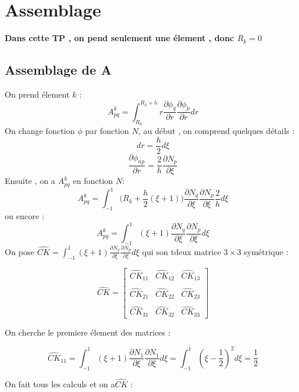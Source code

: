\documentclass[a4paper,10pt]{report} %
\begin{document}
\section{Assemblage}
\textbf{Dans cette TP , on pend seulement une élement , donc $R_k=0$ }
\subsection{Assemblage de A}
On prend élement $k$ :
\begin{equation}
A_{pq}^k=\int_{R_k}^{R_k+h}r\frac{\partial \phi_q}{\partial r}\frac{\partial \phi_p}{\partial r}dr
\end{equation}
On change fonction $\phi$ par fonction $N$, au début , on comprend quelques détails :$$dr=\frac{h}{2}d\xi$$
$$\frac{\partial \phi_{np}}{\partial r}=\frac{2}{h}\frac{\partial N_p}{\partial \xi}$$
Ensuite , on a $A_{pq}^k$ en fonction $N$:
\begin{equation}
A_{pq}^k=\int_{-1}^{1}\Big(R_k+\frac{h}{2}(\xi+1)\Big)\frac{\partial N_q}{\partial \xi}\frac{\partial N_p}{\partial \xi}\frac{2}{h}d\xi
\end{equation}
ou encore :
\begin{equation}
A_{pq}^k=\int_{-1}^{1}(\xi+1)\frac{\partial N_q}{\partial \xi}\frac{\partial N_p}{\partial \xi}d\xi
\end{equation}
On pose  $\widehat{CK}=\int_{-1}^{1}(\xi+1)\frac{\partial N_q}{\partial \xi}\frac{\partial N_p}{\partial \xi}d\xi$ qui son tdeux matrice $3\times3$ symétrique :


\[ \widehat{CK}=\left[ \begin{array}{ccc}
\widehat{CK}_{11} & \widehat{CK}_{12} & \widehat{CK}_{13} \\\\
\widehat{CK}_{21} & \widehat{CK}_{22} & \widehat{CK}_{23} \\\\
\widehat{CK}_{31} & \widehat{CK}_{32} &\widehat{CK}_{33} \end{array} \right]\]

On cherche le premiere élement des matrices :

\begin{equation}
\widehat{CK}_{11}=\int_{-1}^{1}(\xi+1)\frac{\partial N_1}{\partial \xi}\frac{\partial N_1}{\partial \xi}d\xi=\int_{-1}^{1}(\xi-\frac{1}{2})^2d\xi=\frac{1}{2}
\end{equation}

On fait tous les calculs et on a$\widehat{CK}$ :
\end{document}
